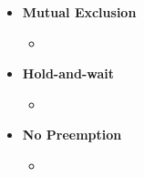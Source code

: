\documentclass[12pt]{article}
\begin{document}
\begin{enumerate}[1.]
\begin{enumerate}[a)]
\begin{itemize}
\begin{itemize}
\begin{itemize}
\begin{itemize}
                        (Simple) \texttt{i\_mutex} before \texttt{i\_mmap\_mutex}

                        \bigskip

                        (More complex) \texttt{i\_mmap\_mutex} before \texttt{private\_lock}
                        before \texttt{swap\_lock} before \texttt{mapping->tree\_lock}

                    \end{itemize}
                    \item \textbf{Mutual Exclusion}
                    \begin{itemize}
                        \item
                    \end{itemize}
                    \item \textbf{Hold-and-wait}
                    \begin{itemize}
                        \item
                    \end{itemize}

                    \item \textbf{No Preemption}
                    \begin{itemize}
                        \item
                    \end{itemize}
                \end{itemize}

            \end{itemize}
        \end{itemize}
    \end{enumerate}

\end{enumerate}
\end{document}
